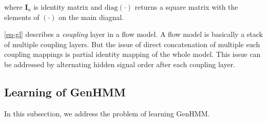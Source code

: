 \documentclass[letterpaper]{article} %
\begin{document}
where $\bm{I}_a$ is identity matrix and $\mathrm{diag}(\cdot)$ returns a square matrix with the elements of $(\cdot)$ on the main diagnal.

\eqref{eq-gl} describes a \textit{coupling} layer in a flow model. A flow model is basically a stack of multiple coupling layers. But the issue of direct concatenation of multiple such coupling mappings is partial identity mapping of the whole model. This issue can be addressed by alternating hidden signal order after each coupling layer.


\subsection{Learning of GenHMM}\label{subsec:optmGenHMM}
In this subsection, we address the problem of learning GenHMM.
\end{document}
